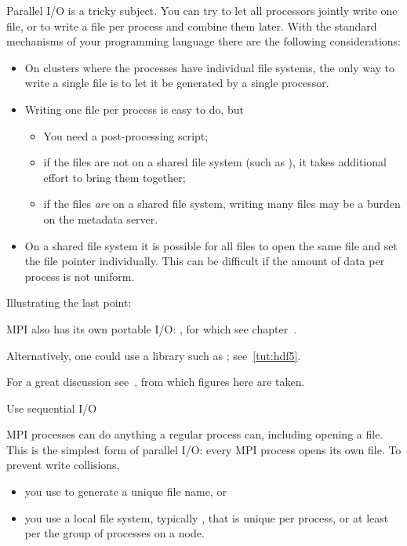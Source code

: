 
Parallel I/O is a tricky subject. You can try to let all processors
jointly write one file, or to write a file per process and combine
them later. With the standard mechanisms of your programming language
there are the following considerations:
\begin{itemize}
\item On clusters where the processes have individual file systems,
  the only way to write a single file is to let it be generated by a
  single processor.
\item Writing one file per process is easy to do, but
  \begin{itemize}
  \item You need a post-processing script;
  \item if the files are not on a shared file system (such as
    ), it takes additional effort to bring them
    together;
  \item if the files \emph{are} on a shared file system, writing many
    files may be a burden on the metadata server.
  \end{itemize}
\item On a shared file system it is possible for all files to open the
  same file and set the file pointer individually. This can be
  difficult if the amount of data per process is not uniform.
\end{itemize}
Illustrating the last point:
%

MPI also has its own portable I/O: , for which
see chapter~.

Alternatively, one could use a library such as ;
see~\ref{tut:hdf5}.

For a great discussion see~\cite{Mendez:ParallelIOpage},
from which figures here are taken.

 {Use sequential I/O}

MPI processes can do anything a regular process can,
including opening a file.
This is the simplest form of parallel I/O:
every MPI process opens its own file.
To prevent write collisions,
\begin{itemize}
\item you use  to generate a unique file name, or
\item you use a local file system, typically , that is unique
  per process, or at least per the group of processes on a node.
\end{itemize}

